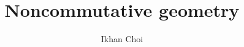 \documentclass{../../large}
\begin{document}
\title{Noncommutative geometry}
\author{Ikhan Choi}
\maketitle
\tableofcontents


\chapter{}
\end{document}
